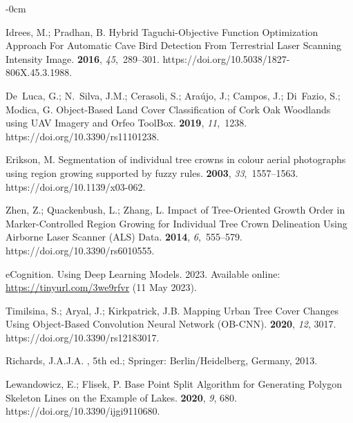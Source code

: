 \documentclass[remotesensing,article,accept,pdftex,moreauthors]{Definitions/mdpi}
\begin{document}
\begin{adjustwidth}{-\extralength}{0cm}
\begin{thebibliography}{999}
Idrees, M.; Pradhan, B.
\newblock Hybrid Taguchi-Objective Function Optimization Approach For Automatic
  Cave Bird Detection From Terrestrial Laser Scanning Intensity Image.
 {\bf 2016}, {\em
  45},~289--301.
\newblock https://doi.org/10.5038/1827-806X.45.3.1988.

De~Luca, G.; N.~Silva, J.M.; Cerasoli, S.; Araújo, J.; Campos, J.; Di~Fazio,
  S.; Modica, G.
\newblock Object-Based Land Cover Classification of Cork Oak Woodlands using
  UAV Imagery and Orfeo ToolBox.
 {\bf 2019}, {\em 11},~1238.
\newblock https://doi.org/10.3390/rs11101238.

Erikson, M.
\newblock Segmentation of individual tree crowns in colour aerial photographs
  using region growing supported by fuzzy rules.
 {\bf 2003}, {\em
  33},~1557--1563. https://doi.org/10.1139/x03-062.

Zhen, Z.; Quackenbush, L.; Zhang, L.
\newblock Impact of Tree-Oriented Growth Order in Marker-Controlled Region
  Growing for Individual Tree Crown Delineation Using Airborne Laser Scanner
  (ALS) Data.
 {\bf 2014}, {\em
  6},~555--579.
\newblock https://doi.org/10.3390/rs6010555.

eCognition.
\newblock Using Deep Learning Models. 2023.  Available online: \url{https://tinyurl.com/3we9rfvr} (11 May 2023). %

Timilsina, S.; Aryal, J.; Kirkpatrick, J.B.
\newblock Mapping Urban Tree Cover Changes Using Object-Based Convolution
  Neural Network (OB-CNN).
 {\bf 2020}, {\em 12}, {3017}.
\newblock https://doi.org/10.3390/rs12183017.

Richards, J.A.J.A.
, 5th ed.; Springer:  Berlin/Heidelberg, Germany,
2013. %

Lewandowicz, E.; Flisek, P.
\newblock Base Point Split Algorithm for Generating Polygon Skeleton Lines on
  the Example of Lakes.
 {\bf 2020}, {\em
  9}, {680}.
\newblock https://doi.org/10.3390/ijgi9110680.


\end{thebibliography}
\end{adjustwidth}
\end{document}
